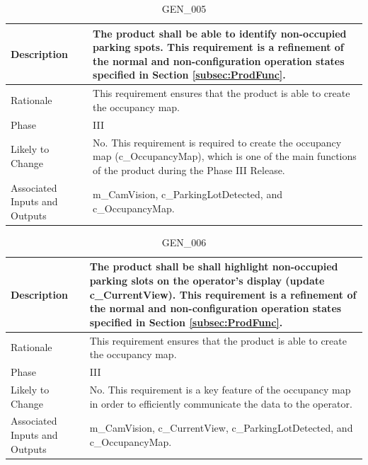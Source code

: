 \documentclass{article}
\begin{document}
\begin{table}[!h]
\begin{center}
\caption {GEN\_005} 
\label{GEN_005}
\begin{tabular}{ | m{3cm} | m{11cm} |}
\hline
Description & The product shall be able to identify non-occupied parking spots. This requirement is a refinement of the normal and non-configuration operation states specified in Section \ref{subsec:ProdFunc}. \\
\hline
Rationale & This requirement ensures that the product is able to create the occupancy map. \\
\hline
Phase & III \\
\hline
Likely to Change & No. This requirement is required to create the occupancy map (c_OccupancyMap), which is one of the main functions of the product during the Phase III Release. \\
\hline
Associated Inputs and Outputs & m\_CamVision, c\_ParkingLotDetected, and c\_OccupancyMap. \\
\hline
\end{tabular}
\end{center}
\end{table}

\begin{table}[!h]
\begin{center}
\caption {GEN\_006} 
\label{GEN_006}
\begin{tabular}{ | m{3cm} | m{11cm} | }
\hline
Description & The product shall be shall highlight non-occupied parking slots on the operator's display (update c_CurrentView). This requirement is a refinement of the normal and non-configuration operation states specified in Section \ref{subsec:ProdFunc}. \\
\hline
Rationale & This requirement ensures that the product is able to create the occupancy map. \\
\hline
Phase & III \\
\hline
Likely to Change & No. This requirement is a key feature of the occupancy map in order to efficiently communicate the data to the operator. \\
\hline
Associated Inputs and Outputs & m\_CamVision, c\_CurrentView, c\_ParkingLotDetected, and c\_OccupancyMap. \\
\hline
\end{tabular}
\end{center}
\end{table}

\clearpage
\newpage
\end{document}
